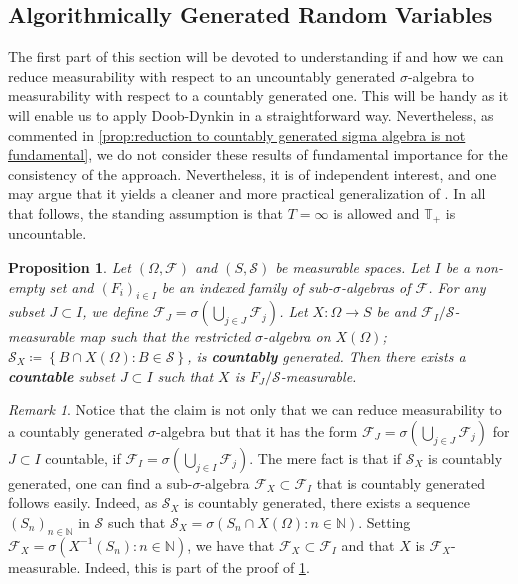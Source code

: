 \documentclass[11pt]{report}
\theoremstyle{plain} %
\newtheorem{proposition}[proposition]{Proposition}
\theoremstyle{definition} %
\theoremstyle{remark} %
\newtheorem{remark}[remark]{Remark}
\begin{document}
 \subsection{Algorithmically Generated Random Variables}\label{sec:algorithmically generated random variables}
 The first part of this section will be devoted to understanding if and how we can reduce measurability with respect to an uncountably generated \(\sigma\)-algebra to measurability with respect to a countably generated one. This will be handy as it will enable us to apply Doob-Dynkin in a straightforward way. Nevertheless, as commented in \cref{prop:reduction to countably generated sigma algebra is not fundamental}, we do not consider these results of fundamental importance for the consistency of the approach. Nevertheless, it is of independent interest, and one may argue that it yields a cleaner and more practical generalization of \parencite{Buehler2018DeepHedging}.
 \bigbreak
 In all that follows, the standing assumption is that \(T=\infty\) is allowed and \(\mathbb{T}_+\) is uncountable.  
 \begin{proposition}\label{prop:reduction to countable measurability}
     Let \((\Omega,\mathcal{F})\) and \((S,\mathcal{S})\) be measurable spaces. Let \(I\) be a non-empty set and \((F_i)_{i\in I}\) be an indexed family of sub-\(\sigma\)-algebras of \(\mathcal{F}\). For any subset \(J\subset I\), we define \(\mathcal{F}_J=\sigma(\bigcup_{j\in J}\mathcal{F}_j)\). Let \(X:\Omega\to S\) be and \(\mathcal{F}_I/\mathcal
     S\)-measurable map such that the restricted \(\sigma\)-algebra on \(X(\Omega)\); \(\mathcal{S}_X\coloneqq\left\{B\cap X(\Omega):B\in \mathcal{S}\right\}\), is \textbf{countably} generated. Then there exists a \textbf{countable} subset \(J\subset I\) such that \(X\) is \(F_{J}/\mathcal{S}\)-measurable. 
 \end{proposition}
 \begin{remark}\label{Remark:countably generated sigma algebra}
      Notice that the claim is not only that we can reduce measurability to a countably generated \(\sigma\)-algebra but that it has the form \(\mathcal{F}_J=\sigma(\bigcup_{j\in J}\mathcal{F}_j)\) for \(J\subset I\) countable, if \(\mathcal{F}_I=\sigma(\bigcup_{j\in I}\mathcal{F}_j)\). The mere fact is that if \(\mathcal{S}_X\) is countably generated, one can find a sub-\(\sigma\)-algebra \(\mathcal{F}_X\subset\mathcal{F}_I\) that is countably generated follows easily. Indeed, as \(\mathcal{S}_X\) is countably generated, there exists a sequence \((S_n)_{n\in\mathbb{N}}\) in \(\mathcal{S}\) such that \(\mathcal{S}_X=\sigma(S_n\cap X(\Omega):n\in\mathbb{N})\). Setting 
 \(\mathcal{F}_X=\sigma(X^{-1}(S_n):n\in\mathbb{N})\), we have that \(\mathcal{F}_X\subset\mathcal{F}_I\) and that \(X\) is \(\mathcal{F}_X\)-measurable. Indeed, this is part of the proof of \cref{prop:reduction to countable measurability}. 
 \end{remark}
\end{document}
